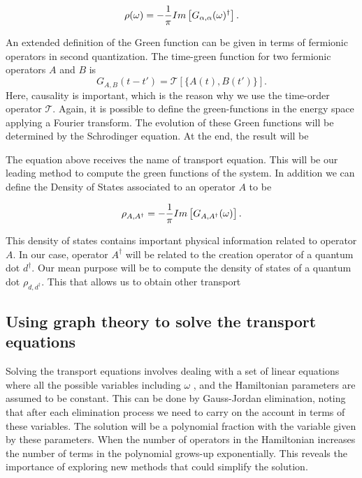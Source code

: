 \begin{equation}
    \rho(\omega)=-\frac{1}{\pi} Im \left[G_{\alpha,\alpha}(\omega)^{\dagger}\right].
\end{equation}

An extended definition of the Green function  can be given in terms of fermionic operators in second quantization.  The time-green function for two fermionic operators $A$ and $B$ is
\begin{equation}
  G_{A,B}(t-t') = \mathcal{T}[\{ A(t),B(t') \} ].
\end{equation}
Here, causality is important, which is the reason why we use the time-order operator $\mathcal{T}$. Again, it is possible to define the green-functions in the energy space applying a Fourier transform. The evolution of these Green functions will be determined by the Schrodinger equation. At the end, the result will be



The equation above receives the name of transport equation. This will be our leading method to compute the green functions of the system. In addition we can define the Density of States associated to an operator $A$ to be 

\begin{equation}
    \rho_{A,A^\dagger}=-\frac{1}{\pi}Im\left[G_{A,A^\dagger}(\omega)\right].
    \label{eq:Density of States}
\end{equation}

This density of states contains important physical information related to operator $A$. In our case, operator $A^\dagger$ will be related to the creation operator of a quantum dot $d^\dagger$. Our mean purpose will be to compute the density of states of a quantum dot $\rho_{d,d^\dagger}$. This 
that allows us to obtain other transport 

\subsection{Using graph theory to solve the transport equations \label{sec:GraphMethod}}


Solving the transport equations involves dealing with a set of linear equations where all the possible variables including  $\omega$ , and the Hamiltonian parameters are assumed to be constant.  This can be done by  Gauss-Jordan elimination, noting that after each elimination process we need to carry on the account in terms of these variables. The solution  will be a polynomial fraction with the variable given by these parameters.  When the number of operators in the Hamiltonian increases the number of terms in the polynomial grows-up exponentially. This reveals the importance of exploring new methods that could simplify the solution.   \\

